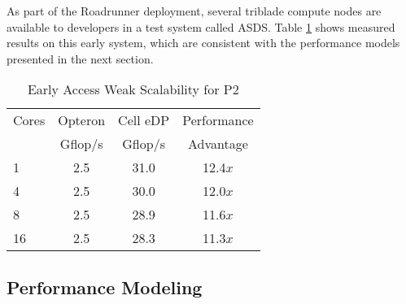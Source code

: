 \documentclass[letter,10pt]{article}
\begin{document}
As part of the Roadrunner deployment, several triblade compute
nodes are available to developers in a test system called ASDS.
Table \ref{tab:weak} shows measured results on this early system,
which are consistent with the performance models presented in
the next section.

\begin{table}
\begin{center}
\begin{tabular}{l c c c}
\hline
\hline
Cores & Opteron & Cell eDP & Performance \\
 & Gflop/s & Gflop/s & Advantage \\
\hline
 1  & 2.5 & 31.0 & 12.4$x$ \\
 4  & 2.5 & 30.0 & 12.0$x$ \\
 8  & 2.5 & 28.9 & 11.6$x$ \\
 16 & 2.5 & 28.3 & 11.3$x$ \\
\hline
\end{tabular}
\end{center}
\caption{Early Access Weak Scalability for P2}
\label{tab:weak}
\end{table}


%
%
%
%
%

\subsection{Performance Modeling}
\end{document}
